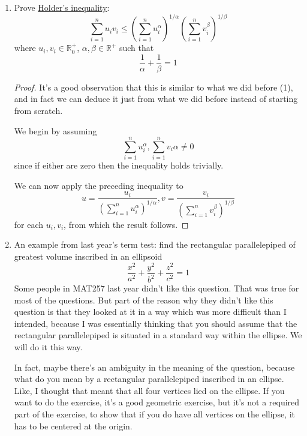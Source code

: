 \documentclass{article}
\newcommand{\reals}[0]{\mathbb{R}}
\begin{document}
\begin{enumerate}
  \item Prove \underline{Holder's inequality}:
  \begin{equation}\sum_{i = 1}^nu_iv_i \leq \left(\sum_{i = 1}^nu_i^\alpha\right)^{1/\alpha}\left(\sum_{i = 1}^nv_i^\beta\right)^{1/\beta}\end{equation}
  where \(u_i, v_i \in \reals^+_0\), \(\alpha, \beta \in \reals^+\) such that
  \begin{equation}\frac{1}{\alpha} + \frac{1}{\beta} = 1\end{equation}

  \begin{proof}
    It's a good observation that this is similar to what we did before (1), and in fact we can deduce it just from what we did before instead of starting from scratch.

    We begin by assuming
    \begin{equation}\sum_{i = 1}^nu_i^\alpha, \sum_{i = 1}^nv_i\alpha \neq 0\end{equation}
    since if either are zero then the inequality holds trivially.

    We can now apply the preceding inequality to
    \begin{equation}u = \frac{u_i}{\left(\sum_{i = 1}^nu_i^\alpha\right)^{1/\alpha}}, v = \frac{v_i}{\left(\sum_{i = 1}^nv_i^\beta\right)^{1/\beta}}\end{equation}
    for each \(u_i, v_i\), from which the result follows.
  \end{proof}

  \item An example from last year's term test: find the rectangular parallelepiped of greatest volume inscribed in an ellipsoid
  \begin{equation}\frac{x^2}{a^2} + \frac{y^2}{b^2} + \frac{z^2}{c^2} = 1\end{equation}
  Some people in MAT257 last year didn't like this question. That was true for most of the questions. But part of the reason why they didn't like this question is that they looked at it in a way which was more difficult than I intended, because I was essentially thinking that you should assume that the rectangular parallelepiped is situated in a standard way within the ellipse. We will do it this way.

  In fact, maybe there's an ambiguity in the meaning of the question, because what do you mean by a rectangular parallelepiped inscribed in an ellipse. Like, I thought that meant that all four vertices lied on the ellipse. If you want to do the exercise, it's a good geometric exercise, but it's not a required part of the exercise, to show that if you do have all vertices on the ellipse, it has to be centered at the origin.


\end{enumerate}
\end{document}
